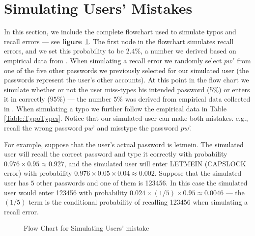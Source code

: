 

\appendix


\section{Simulating Users' Mistakes}\label{appendix:simulateMistakes}
\vspace*{-\baselineskip}
In this section, we include the complete flowchart used to simulate typos and recall errors --- see \textbf{figure}~\ref{figure:flowChartTypo}. The first node in the flowchart simulates recall errors, and we set this probability to be $2.4\%$, a number we derived based on empirical data from \cite{CCS:CWPCR17,SP:CAAJR16}. When simulating a recall error we randomly select $pw'$ from one of the five other passwords we previously selected for our simulated user (the passwords represent the user's other accounts). At this point in the flow chart we simulate whether or not the user miss-types his intended password (5\%) or enters it in correctly ($95\%$) --- the number $5\%$ was derived from empirical data collected in \cite{CCS:CWPCR17,SP:CAAJR16}. When simulating a typo we further follow the empirical data in Table \ref{Table:TypoTypes}. Notice that our simulated user can make both mistakes. e.g., recall the wrong password $pw$' and misstype the password $pw$'. 

For example, suppose that the user's actual password is letmein. The simulated user will recall the correct password and type it correctly with probability $0.976 \times 0.95 \approx 0.927$, and the simulated user will enter LETMEIN (CAPSLOCK error) with probability $0.976 \times 0.05 \times 0.04 \approx 0.002$. Suppose that the simulated user has $5$ other passwords and one of them is 123456. In this case the simulated user would enter 123456 with probability $0.024 \times (1/5) \times 0.95 \approx 0.0046$ --- the $(1/5)$ term is the conditional probability of recalling 123456 when simulating a recall error.


\begin{figure}
	
	\vspace{-0.2in}
	\caption{Flow Chart for Simulating Users' mistake}\label{figure:flowChartTypo}
\end{figure}

